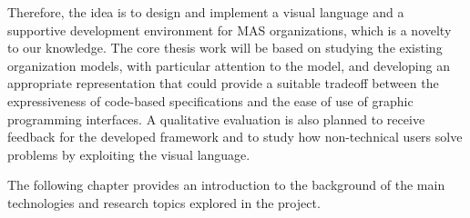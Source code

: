 Therefore, the idea is to design and implement a visual language and a supportive development environment for MAS organizations, which is a novelty to our knowledge.
The core thesis work will be based on studying the existing organization models, with particular attention to the \moiseplus{} model, and developing an appropriate representation that could provide a suitable tradeoff between the expressiveness of code-based specifications and the ease of use of graphic programming interfaces.
A qualitative evaluation is also planned to receive feedback for the developed framework and to study how non-technical users solve problems by exploiting the visual language.

The following chapter provides an introduction to the background of the main technologies and research topics explored in the project.